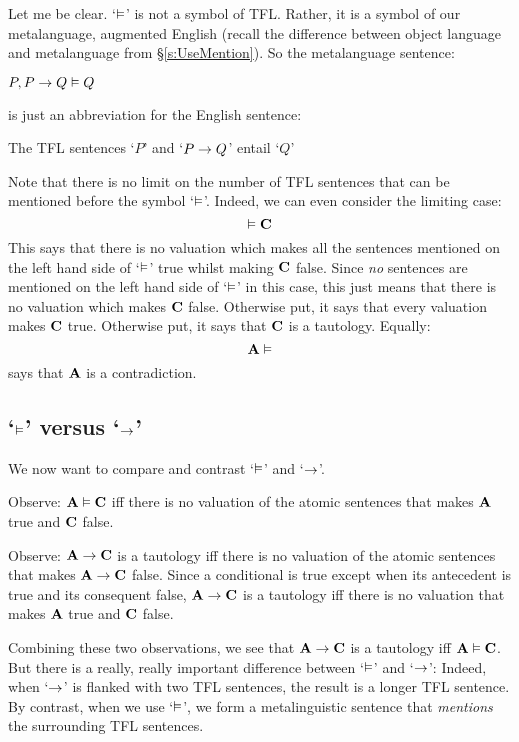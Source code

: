 Let me be clear. `$\vDash$' is not a symbol of TFL. Rather, it is a symbol of our metalanguage, augmented English (recall the difference between object language and metalanguage from \S\ref{s:UseMention}). So the metalanguage sentence:
\begin{ebullet}
	\item $P, P \rightarrow Q \vDash Q$
\end{ebullet}
is just an abbreviation for the English sentence: 
\begin{ebullet}
	\item The TFL sentences `$P$' and `$P \rightarrow Q$' entail `$Q$'
\end{ebullet}
Note that there is no limit on the number of TFL sentences that can be mentioned before the symbol `$\vDash$'. Indeed, we can even consider the limiting case:
$$\vDash \mathbf{C}$$
This says that there is no valuation which makes all the sentences mentioned on the left hand side of `$\vDash$' true whilst making $\mathbf{C}$ false. Since \emph{no} sentences are mentioned on the left hand side of `$\vDash$' in this case, this just means that there is no valuation which makes $\mathbf{C}$ false. Otherwise put, it says that every valuation makes $\mathbf{C}$ true. Otherwise put, it says that $\mathbf{C}$ is a tautology. Equally:
$$\mathbf{A} \vDash$$
says that $\mathbf{A}$ is a contradiction.

\subsection{`$\vDash$' versus `$\rightarrow$'}
We now want to compare and contrast `$\vDash$' and `$\rightarrow$'. 

Observe: $\mathbf{A} \vDash \mathbf{C}$ iff there is no valuation of the atomic sentences that makes $\mathbf{A}$ true and $\mathbf{C}$ false. 

Observe: $\mathbf{A} \rightarrow \mathbf{C}$ is a tautology iff there is no valuation of the atomic sentences that makes $\mathbf{A} \rightarrow \mathbf{C}$ false. Since a conditional is true except when its antecedent is true and its consequent false, $\mathbf{A} \rightarrow \mathbf{C}$ is a tautology iff there is no valuation that makes $\mathbf{A}$ true and $\mathbf{C}$ false. 

Combining these two observations, we see that $\mathbf{A} \rightarrow \mathbf{C}$  is a tautology iff  $\mathbf{A} \vDash \mathbf{C}$. But there is a really, really important difference between `$\vDash$' and `$\rightarrow$':
Indeed, when `$\rightarrow$' is flanked with two TFL sentences, the result is a longer TFL sentence. By contrast, when we use `$\vDash$', we form a metalinguistic sentence that \emph{mentions} the surrounding TFL sentences. 

